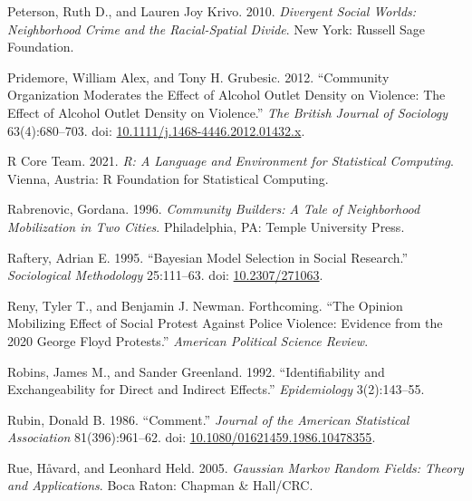 \documentclass [11pt, proquest] {uwthesis}[2015/03/03]
\newlength{\cslhangindent}
\newenvironment{CSLReferences}[2]%
{\setlength{\parindent}{0pt}%
\everypar{\setlength{\hangindent}{\cslhangindent}}\ignorespaces}%
{\par}
\begin{document}
\begin{CSLReferences}{1}{0}
\leavevmode\hypertarget{ref-petersonDivergentSocialWorlds2010}{}%
Peterson, Ruth D., and Lauren Joy Krivo. 2010. \emph{Divergent Social Worlds: Neighborhood Crime and the Racial-Spatial Divide}. {New York}: {Russell Sage Foundation}.

\leavevmode\hypertarget{ref-pridemoreCommunityOrganizationModerates2012}{}%
Pridemore, William Alex, and Tony H. Grubesic. 2012. {``Community {Organization Moderates} the {Effect} of {Alcohol Outlet Density} on {Violence}: {The Effect} of {Alcohol Outlet Density} on {Violence}.''} \emph{The British Journal of Sociology} 63(4):680--703. doi: \href{https://doi.org/10.1111/j.1468-4446.2012.01432.x}{10.1111/j.1468-4446.2012.01432.x}.

\leavevmode\hypertarget{ref-rcoreteamLanguageEnvironmentStatistical2021}{}%
R Core Team. 2021. \emph{R: {A} Language and Environment for Statistical Computing}. {Vienna, Austria}: {R Foundation for Statistical Computing}.

\leavevmode\hypertarget{ref-rabrenovicCommunityBuildersTale1996}{}%
Rabrenovic, Gordana. 1996. \emph{Community {Builders}: {A Tale} of {Neighborhood Mobilization} in {Two Cities}}. {Philadelphia, PA}: {Temple University Press}.

\leavevmode\hypertarget{ref-rafteryBayesianModelSelection1995}{}%
Raftery, Adrian E. 1995. {``Bayesian {Model Selection} in {Social Research}.''} \emph{Sociological Methodology} 25:111--63. doi: \href{https://doi.org/10.2307/271063}{10.2307/271063}.

\leavevmode\hypertarget{ref-renyOpinionMobilizingEffectForthcoming}{}%
Reny, Tyler T., and Benjamin J. Newman. Forthcoming. {``The {Opinion Mobilizing Effect} of {Social Protest Against Police Violence}: {Evidence} from the 2020 {George Floyd Protests}.''} \emph{American Political Science Review}.

\leavevmode\hypertarget{ref-robinsIdentifiabilityExchangeabilityDirect1992}{}%
Robins, James M., and Sander Greenland. 1992. {``Identifiability and {Exchangeability} for {Direct} and {Indirect Effects}.''} \emph{Epidemiology} 3(2):143--55.

\leavevmode\hypertarget{ref-rubinComment1986}{}%
Rubin, Donald B. 1986. {``Comment.''} \emph{Journal of the American Statistical Association} 81(396):961--62. doi: \href{https://doi.org/10.1080/01621459.1986.10478355}{10.1080/01621459.1986.10478355}.

\leavevmode\hypertarget{ref-rueGaussianMarkovRandom2005}{}%
Rue, Håvard, and Leonhard Held. 2005. \emph{Gaussian {Markov} Random Fields: Theory and Applications}. {Boca Raton}: {Chapman \& Hall/CRC}.


\end{CSLReferences}
\end{document}
